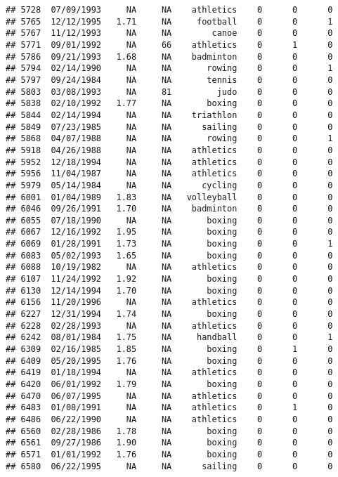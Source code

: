 \documentclass[]{article}
\begin{document}
\begin{verbatim}
## 5728  07/09/1993     NA     NA    athletics    0      0      0
## 5765  12/12/1995   1.71     NA     football    0      0      1
## 5767  11/12/1993     NA     NA        canoe    0      0      0
## 5771  09/01/1992     NA     66    athletics    0      1      0
## 5786  09/21/1993   1.68     NA    badminton    0      0      0
## 5794  02/14/1990     NA     NA       rowing    0      0      1
## 5797  09/24/1984     NA     NA       tennis    0      0      0
## 5803  03/08/1993     NA     81         judo    0      0      0
## 5838  02/10/1992   1.77     NA       boxing    0      0      0
## 5844  02/14/1994     NA     NA    triathlon    0      0      0
## 5849  07/23/1985     NA     NA      sailing    0      0      0
## 5868  04/07/1988     NA     NA       rowing    0      0      1
## 5918  04/26/1988     NA     NA    athletics    0      0      0
## 5952  12/18/1994     NA     NA    athletics    0      0      0
## 5956  11/04/1987     NA     NA    athletics    0      0      0
## 5979  05/14/1984     NA     NA      cycling    0      0      0
## 6001  01/04/1989   1.83     NA   volleyball    0      0      0
## 6046  09/26/1991   1.70     NA    badminton    0      0      0
## 6055  07/18/1990     NA     NA       boxing    0      0      0
## 6067  12/16/1992   1.95     NA       boxing    0      0      0
## 6069  01/28/1991   1.73     NA       boxing    0      0      1
## 6083  05/02/1993   1.65     NA       boxing    0      0      0
## 6088  10/19/1982     NA     NA    athletics    0      0      0
## 6107  11/24/1992   1.92     NA       boxing    0      0      0
## 6130  12/14/1994   1.70     NA       boxing    0      0      0
## 6156  11/20/1996     NA     NA    athletics    0      0      0
## 6227  12/31/1994   1.74     NA       boxing    0      0      0
## 6228  02/28/1993     NA     NA    athletics    0      0      0
## 6242  08/01/1984   1.75     NA     handball    0      0      1
## 6309  02/16/1985   1.85     NA       boxing    0      1      0
## 6409  05/20/1995   1.76     NA       boxing    0      0      0
## 6419  01/18/1994     NA     NA    athletics    0      0      0
## 6420  06/01/1992   1.79     NA       boxing    0      0      0
## 6470  06/07/1995     NA     NA    athletics    0      0      0
## 6483  01/08/1991     NA     NA    athletics    0      1      0
## 6486  06/22/1990     NA     NA    athletics    0      0      0
## 6560  02/28/1986   1.78     NA       boxing    0      0      0
## 6561  09/27/1986   1.90     NA       boxing    0      0      0
## 6571  01/01/1992   1.76     NA       boxing    0      0      0
## 6580  06/22/1995     NA     NA      sailing    0      0      0

\end{verbatim}
\end{document}
